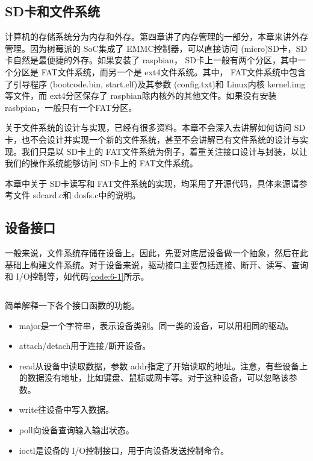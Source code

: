 \documentclass[main.tex]{subfiles}
\begin{document}
\ifxetex\else\begin{CJK*}{UTF8}{song}\fi

\chapter{SD卡和文件系统}
计算机的存储系统分为内存和外存。第四章讲了内存管理的一部分，本章来讲外存管理。因为树莓派的 SoC集成了 EMMC控制器，可以直接访问 (micro)SD卡，SD卡自然是最便捷的外存。如果安装了 rasp\-bian， SD卡上一般有两个分区，其中一个分区是 FAT文件系统，而另一个是 ext4文件系统。其中， FAT文件系统中包含了引导程序 (boot\-code.bin, start.elf)及其参数 (config.txt)和 Linux内核 kernel.img等文件，而 ext4分区保存了 rasp\-bian除内核外的其他文件。如果没有安装 rasbpian，一般只有一个FAT分区。

\par
关于文件系统的设计与实现，已经有很多资料。本章不会深入去讲解如何访问 SD卡，也不会设计并实现一个新的文件系统，甚至不会讲解已有文件系统的设计与实现。我们只是以 SD卡上的 FAT文件系统为例子，着重关注接口设计与封装，以让我们的操作系统能够访问 SD卡上的 FAT文件系统。

\par
本章中关于 SD卡读写和 FAT文件系统的实现，均采用了开源代码，具体来源请参考文件 sd\-card.c和 dos\-fs.c中的说明。

\section{设备接口}
一般来说，文件系统存储在设备上。因此，先要对底层设备做一个抽象，然后在此基础上构建文件系统。对于设备来说，驱动接口主要包括连接、断开、读写、查询和 I/O控制等，如代码\ref{code:6-1}所示。

\begin{code}
\label{code:6-1}
\inputminted[firstline=135,lastline=157,linenos,numbersep=5pt,frame=lines,framesep=2mm]{c}{src/chapter06/kernel/kernel.h}
\end{code}

\noindent
简单解释一下各个接口函数的功能。

\begin{itemize}
\item major是一个字符串，表示设备类别。同一类的设备，可以用相同的驱动。
\item attach/detach用于连接/断开设备。
\item read从设备中读取数据，参数 addr指定了开始读取的地址。注意，有些设备上的数据没有地址，比如键盘、鼠标或网卡等。对于这种设备，可以忽略该参数。
\item write往设备中写入数据。
\item poll向设备查询输入输出状态。
\item ioctl是设备的 I/O控制接口，用于向设备发送控制命令。
\end{itemize}


\end{CJK*}
\end{document}
